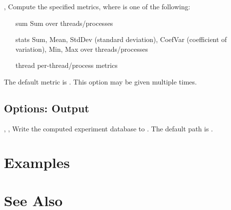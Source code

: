\documentclass[english]{article}
\begin{document}
\begin{Description}

\item[\OptArg{-M}{metric}, \OptArg{--metric}{metric}]
Compute the specified metrics, where  is one of the following:
  \begin{itemize}
  \item[sum] Sum over threads/processes
  \item[stats] Sum, Mean, StdDev (standard deviation), CoefVar (coefficient of variation),
  Min, Max over threads/processes
  \item[thread] per-thread/process metrics
  \end{itemize}

The default metric is .
This option may be given multiple times.

\end{Description}

\subsection{Options: Output}

\begin{Description}

\item[\OptArg{-o}{db-path}, \OptArg{--db}{db-path}, \OptArg{--output}{db-path}]
Write the computed experiment database to .
The default path is .

\end{Description}


\section{Examples}






\section{See Also}
\end{document}
